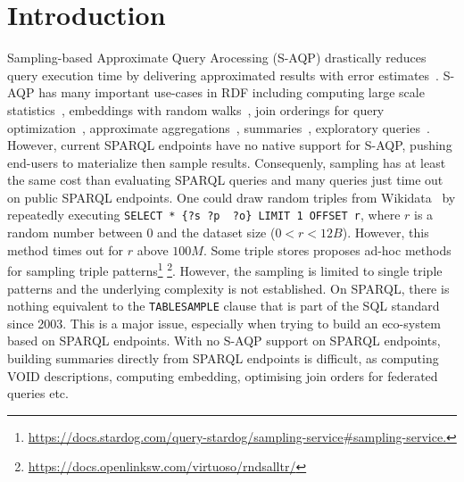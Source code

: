
\section{Introduction}

Sampling-based Approximate Query Arocessing (S-AQP) drastically reduces query
execution time by delivering approximated results with error
estimates~\cite{DBLP:conf/sigmod/AgarwalMKTJMMS14}. S-AQP has many important use-cases in RDF including
computing large scale
statistics~\cite{soulet2019anytime,10.1007/978-3-319-18818-8_14},
embeddings with random walks~\cite{ristoski2016rdf2vec}, join
orderings for query optimization~\cite{DBLP:conf/cidr/LeisRGK017},
approximate
aggregations~\cite{wang2022approximate},
summaries~\cite{10.1007/978-3-030-49461-2_10}, exploratory
queries~\cite{DBLP:conf/sigmod/AgarwalMKTJMMS14}.
%
However, current SPARQL endpoints have no native support for S-AQP,
pushing end-users to materialize then sample
results. Consequenly, sampling has at least  the same cost than evaluating
SPARQL queries and many queries just time out on public SPARQL
endpoints.
%
One could draw random triples from Wikidata~\cite{soulet2019anytime}
by repeatedly executing \lstinline[language=SPARQL]|SELECT * {?s ?p  ?o} LIMIT 1 OFFSET r|,
where $r$ is a random number between $0$ and
the dataset size ($0<r<12B$). However, this method times out for $r$
above $100M$. Some triple stores proposes ad-hoc methods for sampling
triple
patterns\footnote{\url{https://docs.stardog.com/query-stardog/sampling-service\#sampling-service.}}
\footnote{\url{https://docs.openlinksw.com/virtuoso/rndsalltr/}}.
However, the sampling is limited to single triple patterns and the
underlying complexity is not established.  On SPARQL, there is nothing
equivalent to the \texttt{TABLESAMPLE} clause that is part of the SQL
standard since 2003. This is a major issue, especially when trying to
build an eco-system based on SPARQL endpoints. With no S-AQP support
on SPARQL endpoints, building summaries directly from SPARQL endpoints
is difficult, as computing VOID descriptions, computing embedding,
optimising join orders for federated queries etc.


